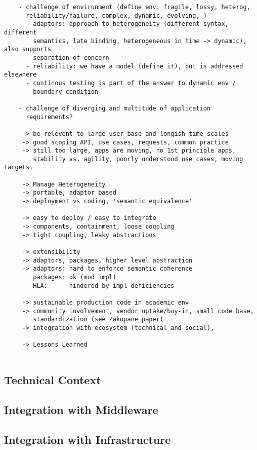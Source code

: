 \documentclass[a4paper,10pt]{article}
\begin{document}
  \begin{verbatim}
    - challenge of environment (define env: fragile, lossy, heterog,
      reliability/failure, complex, dynamic, evolving, ) 
      - adaptors: approach to heterogeneity (different syntax, different
        semantics, late binding, heterogeneous in time -> dynamic), also supports 
        separation of concern
      - reliability: we have a model (define it), but is addressed elsewhere
      - continous testing is part of the answer to dynamic env /
        boundary condition

    - challenge of diverging and multitude of application
      requirements?

     -> be relevent to large user base and longish time scales
     -> good scoping API, use cases, requests, common practice
     -> still too large, apps are moving, no 1st principle apps,
        stability vs. agility, poorly understood use cases, moving targets, 

     -> Manage Heterogeneity
     -> portable, adaptor based
     -> deployment vs coding, 'semantic equivalence'
  
     -> easy to deploy / easy to integrate
     -> components, containment, loose coupling
     -> tight coupling, leaky abstractions
  
     -> extensibility
     -> adaptors, packages, higher level abstraction
     -> adaptors: hard to enforce semantic coherence
        packages: ok (mod impl)
        HLA:      hindered by impl deficiencies
  
     -> sustainable production code in academic env
     -> community involvement, vendor uptake/buy-in, small code base,
        standardization (see Zakopane paper)
     -> integration with ecosystem (technical and social), 
  
     -> Lessons Learned
  
  \end{verbatim}

\subsection{Technical Context}

\subsection{Integration with Middleware}

\subsection{Integration with Infrastructure}
\end{document}
